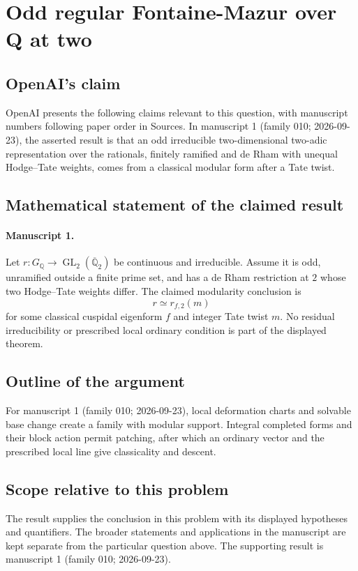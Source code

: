 \documentclass[11pt]{article}
\begin{document}
\section*{Odd regular Fontaine-Mazur over Q at two}

\subsection{OpenAI's claim}
OpenAI presents the following claims relevant to this question, with manuscript numbers following paper order in Sources. In manuscript 1 (family 010; 2026-09-23), the asserted result is that an odd irreducible two-dimensional two-adic representation over the rationals, finitely ramified and de Rham with unequal Hodge--Tate weights, comes from a classical modular form after a Tate twist.

\subsection{Mathematical statement of the claimed result}
\paragraph{Manuscript 1.}
Let $r:G_{\mathbb Q}\to\operatorname{GL}_2(\overline{\mathbb Q}_2)$ be continuous and irreducible. Assume it is odd, unramified outside a finite prime set, and has a de Rham restriction at $2$ whose two Hodge--Tate weights differ. The claimed modularity conclusion is
\[
 r\simeq r_{f,2}(m)
\]
for some classical cuspidal eigenform $f$ and integer Tate twist $m$. No residual irreducibility or prescribed local ordinary condition is part of the displayed theorem.

\subsection{Outline of the argument}
For manuscript 1 (family 010; 2026-09-23), local deformation charts and solvable base change create a family with modular support. Integral completed forms and their block action permit patching, after which an ordinary vector and the prescribed local line give classicality and descent.

\subsection{Scope relative to this problem}
The result supplies the conclusion in this problem with its displayed hypotheses and quantifiers. The broader statements and applications in the manuscript are kept separate from the particular question above. The supporting result is manuscript 1 (family 010; 2026-09-23).
\end{document}
